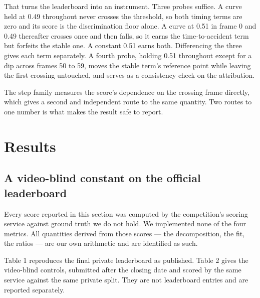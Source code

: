 That turns the leaderboard into an instrument. Three probes suffice. A curve held at 0.49 throughout never crosses the threshold, so both timing terms are zero and its score is the discrimination floor alone. A curve at 0.51 in frame 0 and 0.49 thereafter crosses once and then falls, so it earns the time-to-accident term but forfeits the stable one. A constant 0.51 earns both. Differencing the three gives each term separately. A fourth probe, holding 0.51 throughout except for a dip across frames 50 to 59, moves the stable term's reference point while leaving the first crossing untouched, and serves as a consistency check on the attribution.

The step family measures the score's dependence on the crossing frame directly, which gives a second and independent route to the same quantity. Two routes to one number is what makes the result safe to report.


\section{Results}


\subsection{A video-blind constant on the official leaderboard}
Every score reported in this section was computed by the competition's scoring service against ground truth we do not hold. We implemented none of the four metrics. All quantities derived from those scores --- the decomposition, the fit, the ratios --- are our own arithmetic and are identified as such.

Table 1 reproduces the final private leaderboard as published. Table 2 gives the video-blind controls, submitted after the closing date and scored by the same service against the same private split. They are not leaderboard entries and are reported separately.

